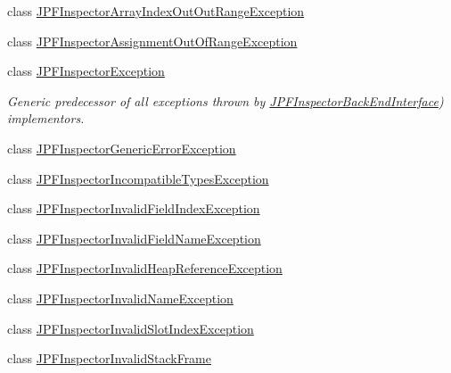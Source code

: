 \begin{DoxyCompactItemize}
\item 
class \hyperlink{classgov_1_1nasa_1_1jpf_1_1inspector_1_1exceptions_1_1_j_p_f_inspector_array_index_out_out_range_exception}{J\+P\+F\+Inspector\+Array\+Index\+Out\+Out\+Range\+Exception}
\item 
class \hyperlink{classgov_1_1nasa_1_1jpf_1_1inspector_1_1exceptions_1_1_j_p_f_inspector_assignment_out_of_range_exception}{J\+P\+F\+Inspector\+Assignment\+Out\+Of\+Range\+Exception}
\item 
class \hyperlink{classgov_1_1nasa_1_1jpf_1_1inspector_1_1exceptions_1_1_j_p_f_inspector_exception}{J\+P\+F\+Inspector\+Exception}
\begin{DoxyCompactList}\small\item\em Generic predecessor of all exceptions thrown by \hyperlink{}{J\+P\+F\+Inspector\+Back\+End\+Interface}) implementors. \end{DoxyCompactList}\item 
class \hyperlink{classgov_1_1nasa_1_1jpf_1_1inspector_1_1exceptions_1_1_j_p_f_inspector_generic_error_exception}{J\+P\+F\+Inspector\+Generic\+Error\+Exception}
\item 
class \hyperlink{classgov_1_1nasa_1_1jpf_1_1inspector_1_1exceptions_1_1_j_p_f_inspector_incompatible_types_exception}{J\+P\+F\+Inspector\+Incompatible\+Types\+Exception}
\item 
class \hyperlink{classgov_1_1nasa_1_1jpf_1_1inspector_1_1exceptions_1_1_j_p_f_inspector_invalid_field_index_exception}{J\+P\+F\+Inspector\+Invalid\+Field\+Index\+Exception}
\item 
class \hyperlink{classgov_1_1nasa_1_1jpf_1_1inspector_1_1exceptions_1_1_j_p_f_inspector_invalid_field_name_exception}{J\+P\+F\+Inspector\+Invalid\+Field\+Name\+Exception}
\item 
class \hyperlink{classgov_1_1nasa_1_1jpf_1_1inspector_1_1exceptions_1_1_j_p_f_inspector_invalid_heap_reference_exception}{J\+P\+F\+Inspector\+Invalid\+Heap\+Reference\+Exception}
\item 
class \hyperlink{classgov_1_1nasa_1_1jpf_1_1inspector_1_1exceptions_1_1_j_p_f_inspector_invalid_name_exception}{J\+P\+F\+Inspector\+Invalid\+Name\+Exception}
\item 
class \hyperlink{classgov_1_1nasa_1_1jpf_1_1inspector_1_1exceptions_1_1_j_p_f_inspector_invalid_slot_index_exception}{J\+P\+F\+Inspector\+Invalid\+Slot\+Index\+Exception}
\item 
class \hyperlink{classgov_1_1nasa_1_1jpf_1_1inspector_1_1exceptions_1_1_j_p_f_inspector_invalid_stack_frame}{J\+P\+F\+Inspector\+Invalid\+Stack\+Frame}

\end{DoxyCompactItemize}
